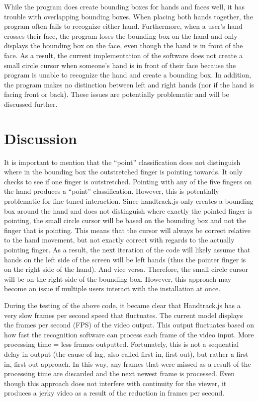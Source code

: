 \documentclass[10pt,twocolumn]{article}
\begin{document}
While the program does create bounding boxes for hands and faces well, it has trouble with overlapping bounding boxes.  When placing both hands together, the program often fails to recognize either hand. Furthermore, when a user's hand crosses their face, the program loses the bounding box on the hand and only displays the bounding box on the face, even though the hand is in front of the face. As a result, the current implementation of the software does not create a small circle cursor when someone's hand is in front of their face because the program is unable to recognize the hand and create a bounding box. In addition, the program makes no distinction between left and right hands (nor if the hand is facing front or back).  These issues are potentially problematic and will be discussed further. 

\section{Discussion}
It is important to mention that the ``point'' classification does not distinguish where in the bounding box the outstretched finger is pointing towards. It only checks to see if one finger is outstretched.  Pointing with any of the five fingers on the hand produces a ``point'' classification. However, this is potentially problematic for fine tuned interaction.  Since handtrack.js only creates a bounding box around the hand and does not distinguish where exactly the pointed finger is pointing, the small circle cursor will be based on the bounding box and not the finger that is pointing. This means that the cursor will always be correct relative to the hand movement, but not exactly correct with regards to the actually pointing finger. As a result, the next iteration of the code will likely assume that hands on the left side of the screen will be left hands (thus the pointer finger is on the right side of the hand).  And vice versa.  Therefore, the small circle cursor will be on the right side of the bounding box. However, this approach may become an issue if multiple users interact with the installation at once. 

During the testing of the above code, it became clear that Handtrack.js has a very slow frames per second speed that fluctuates. 
The current model displays the frames per second (FPS) of the video output.  This output fluctuates based on how fast the recognition software can process each frame of the video input. More processing time = less frames outputted.  Fortunately, this is not a sequential delay in output (the cause of lag, also called first in, first out), but rather a first in, first out approach.  In this way, any frames that were missed as a result of the processing time are discarded and the next newest frame is processed.  Even though this approach does not interfere with continuity for the viewer, it produces a jerky video as a result of the reduction in frames per second.  
\end{document}
